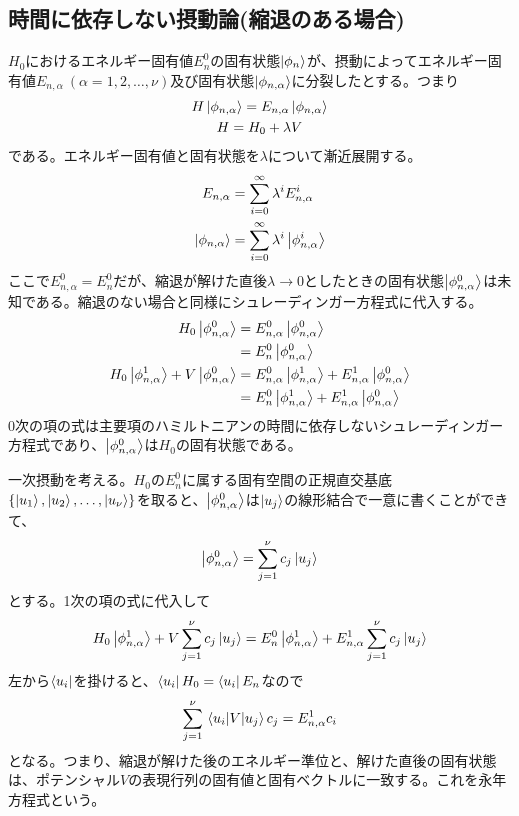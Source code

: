 \subsection{時間に依存しない摂動論(縮退のある場合)}
    $H_0$におけるエネルギー固有値$E_n^0$の固有状態$\ket{\phi_n}$が、摂動によってエネルギー固有値$E_{n,\alpha}\ (\alpha = 1, 2, \dots, \nu)$及び固有状態$\ket{\phi_{n,\alpha}}$に分裂したとする。つまり
    \begin{gather*}
        H\ket{\phi_{n,\alpha}} = E_{n,\alpha}\ket{\phi_{n,\alpha}}\\
        H = H_0 + \lambda V
    \end{gather*}
    である。エネルギー固有値と固有状態を$\lambda$について漸近展開する。
    \begin{align*}
        E_{n,\alpha} &= \sum_{i=0}^\infty \lambda^i E_{n,\alpha}^i\\
        \ket{\phi_{n,\alpha}} &= \sum_{i=0}^\infty \lambda^i \ket{\phi_{n,\alpha}^i}
    \end{align*}
    ここで$E_{n,\alpha}^0 = E_n^0$だが、縮退が解けた直後$\lambda \to 0$としたときの固有状態$\ket{\phi_{n,\alpha}^0}$は未知である。縮退のない場合と同様にシュレーディンガー方程式に代入する。
    \begin{align*}
        H_0\ket{\phi_{n,\alpha}^0}
            &= E_{n,\alpha}^0\ket{\phi_{n,\alpha}^0}\\
            &= E_n^0\ket{\phi_{n,\alpha}^0}\\
        H_0\ket{\phi_{n,\alpha}^1} + V\ket{\phi_{n,\alpha}^0}
            &= E_{n,\alpha}^0\ket{\phi_{n,\alpha}^1} + E_{n,\alpha}^1\ket{\phi_{n,\alpha}^0}\\
            &= E_n^0\ket{\phi_{n,\alpha}^1} + E_{n,\alpha}^1\ket{\phi_{n,\alpha}^0}
    \end{align*}
    0次の項の式は主要項のハミルトニアンの時間に依存しないシュレーディンガー方程式であり、$\ket{\phi_{n,\alpha}^0}$は$H_0$の固有状態である。

    一次摂動を考える。$H_0$の$E_n^0$に属する固有空間の正規直交基底$\{\ket{u_1}, \ket{u_2}, \dots, \ket{u_\nu}\}$を取ると、$\ket{\phi_{n,\alpha}^0}$は$\ket{u_j}$の線形結合で一意に書くことができて、
        \[\ket{\phi_{n,\alpha}^0} = \sum_{j=1}^\nu c_j\ket{u_j}\]
    とする。1次の項の式に代入して
        \[H_0\ket{\phi_{n,\alpha}^1} + V \sum_{j=1}^\nu c_j\ket{u_j} = E_n^0\ket{\phi_{n,\alpha}^1} + E_{n,\alpha}^1 \sum_{j=1}^\nu c_j\ket{u_j}\]
    左から$\bra{u_i}$を掛けると、$\bra{u_i}H_0 = \bra{u_i}E_n$なので
        \[\sum_{j=1}^\nu \mel{u_i}{V}{u_j}c_j = E_{n,\alpha}^1c_i\]
    となる。つまり、縮退が解けた後のエネルギー準位と、解けた直後の固有状態は、ポテンシャル$V$の表現行列の固有値と固有ベクトルに一致する。これを永年方程式という。

